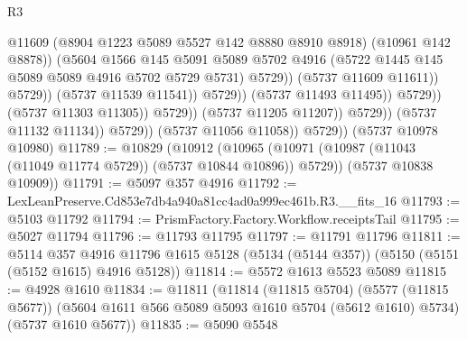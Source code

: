 \begin{lexlean}{R3}
\begin{coremodule}
                                                  @11609
                                                  (@8904 @1223 @5089 @5527 @142 @8880 @8910 @8918)
                                                  (@10961 @142 @8878))
                                                (@5604
                                                  @1566
                                                  @145
                                                  @5091
                                                  @5089
                                                  @5702
                                                  @4916
                                                  (@5722
                                                    @1445
                                                    @145
                                                    @5089
                                                    @5089
                                                    @4916
                                                    @5702
                                                    @5729
                                                    @5731)
                                                  @5729))
                                              (@5737 @11609 @11611))
                                            @5729))
                                        (@5737 @11539 @11541))
                                      @5729))
                                  (@5737 @11493 @11495))
                                @5729))
                            (@5737 @11303 @11305))
                          @5729))
                      (@5737 @11205 @11207))
                    @5729))
                (@5737 @11132 @11134))
              @5729))
          (@5737 @11056 @11058))
        @5729))
    (@5737 @10978 @10980)
@11789 := @10829
    (@10912
      (@10965 (@10971 (@10987 (@11043 (@11049 @11774 @5729)) (@5737 @10844 @10896)) @5729))
      (@5737 @10838 @10909))
@11791 := @5097 @357 @4916
@11792 := LexLeanPreserve.Cd853e7db4a940a81cc4ad0a999ec461b.R3.__fits_16
@11793 := @5103 @11792
@11794 := PrismFactory.Factory.Workflow.receiptsTail
@11795 := @5027 @11794
@11796 := @11793 @11795
@11797 := @11791 @11796
@11811 := @5114
    @357
    @4916
    @11796
    @1615
    @5128
    (@5134 (@5144 @357))
    (@5150 (@5151 (@5152 @1615) @4916 @5128))
@11814 := @5572 @1613 @5523 @5089
@11815 := @4928 @1610
@11834 := @11811
    (@11814
      (@11815 @5704)
      (@5577 (@11815 @5677))
      (@5604 @1611 @566 @5089 @5093 @1610 @5704 (@5612 @1610) @5734)
      (@5737 @1610 @5677))
@11835 := @5090 @5548

\end{coremodule}
\end{lexlean}

